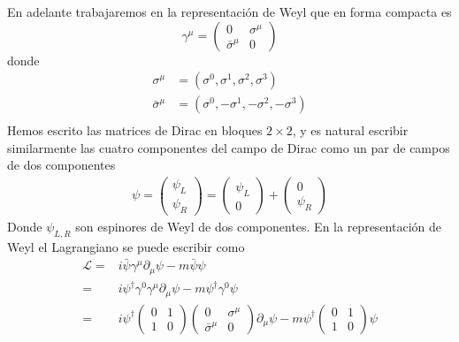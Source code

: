 \begin{subappendices}
\begin{borrar}
\end{borrar}
En adelante trabajaremos en la representaci\'on de Weyl que en forma compacta es
\begin{equation}
  \gamma^\mu=\begin{pmatrix}
    0&\sigma^\mu\\
    \bar{\sigma}^\mu & 0
  \end{pmatrix}
\end{equation}
donde
\begin{align}
  \sigma^\mu&=(\sigma^0,\sigma^1,\sigma^2,\sigma^3)\nonumber\\
  \bar{\sigma}^\mu&=(\sigma^0,-\sigma^1,-\sigma^2,-\sigma^3)\nonumber\\
\end{align}
Hemos escrito las matrices de Dirac en bloques $2\times2$, y es natural escribir similarmente las cuatro componentes del campo de Dirac como un par de campos de dos componentes
\begin{align}
  \psi=  \begin{pmatrix}
    \psi_L\\
    \psi_R    
  \end{pmatrix}=\begin{pmatrix}
    \psi_L\\
    0   
  \end{pmatrix}+\begin{pmatrix}
    0\\
    \psi_R    
  \end{pmatrix}
\end{align}
Donde $\psi_{L,R}$ son espinores de Weyl de dos componentes. En la representaci\'on de Weyl el Lagrangiano se puede escribir como
\begin{align}
\label{eq:200}
  \mathcal{L}=&i\bar{\psi}\gamma^\mu\partial_\mu\psi-m\bar{\psi}\psi\nonumber\\
  =&i\psi^\dagger \gamma^0\gamma^\mu\partial_\mu\psi-m\psi^\dagger \gamma^0 \psi\nonumber\\
  =&i\psi^\dagger  \begin{pmatrix}
    0 & 1\\
    1&0
  \end{pmatrix}
  \begin{pmatrix}
    0 &\sigma^\mu \\
    \bar{\sigma}^\mu&0
  \end{pmatrix}\partial_\mu\psi-m\psi^\dagger
  \begin{pmatrix}
    0 & 1\\
    1&0
  \end{pmatrix}\psi\nonumber\\

\end{align}
\end{subappendices}
